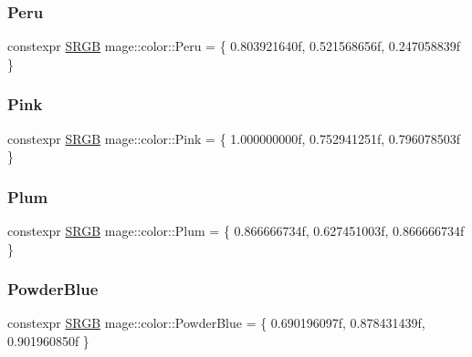 \hypertarget{namespacemage_1_1color_aca42febccdb4b483536cfbb9a2465a95}{}\label{namespacemage_1_1color_aca42febccdb4b483536cfbb9a2465a95} 
\subsubsection{\texorpdfstring{Peru}{Peru}}
{\footnotesize\ttfamily constexpr \hyperlink{structmage_1_1_s_r_g_b}{S\+R\+GB} mage\+::color\+::\+Peru = \{ 0.\+803921640f, 0.\+521568656f, 0.\+247058839f \}}

\hypertarget{namespacemage_1_1color_ac109fad1f6bb079c13fa28ad8bbc18e8}{}\label{namespacemage_1_1color_ac109fad1f6bb079c13fa28ad8bbc18e8} 
\subsubsection{\texorpdfstring{Pink}{Pink}}
{\footnotesize\ttfamily constexpr \hyperlink{structmage_1_1_s_r_g_b}{S\+R\+GB} mage\+::color\+::\+Pink = \{ 1.\+000000000f, 0.\+752941251f, 0.\+796078503f \}}

\hypertarget{namespacemage_1_1color_ac5a82445f9ac2d063ded8fed2abf6d63}{}\label{namespacemage_1_1color_ac5a82445f9ac2d063ded8fed2abf6d63} 
\subsubsection{\texorpdfstring{Plum}{Plum}}
{\footnotesize\ttfamily constexpr \hyperlink{structmage_1_1_s_r_g_b}{S\+R\+GB} mage\+::color\+::\+Plum = \{ 0.\+866666734f, 0.\+627451003f, 0.\+866666734f \}}

\hypertarget{namespacemage_1_1color_a87439299510e5d00a8f52a8e2ec94a3c}{}\label{namespacemage_1_1color_a87439299510e5d00a8f52a8e2ec94a3c} 
\subsubsection{\texorpdfstring{Powder\+Blue}{PowderBlue}}
{\footnotesize\ttfamily constexpr \hyperlink{structmage_1_1_s_r_g_b}{S\+R\+GB} mage\+::color\+::\+Powder\+Blue = \{ 0.\+690196097f, 0.\+878431439f, 0.\+901960850f \}}

